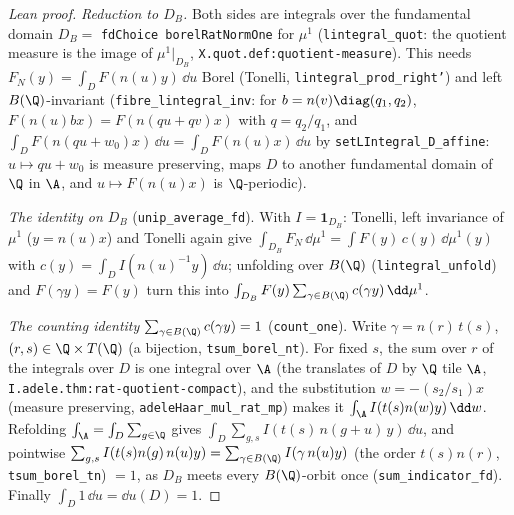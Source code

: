 \begin{proof}[Lean proof]
\emph{Reduction to $D_B$.} Both sides are integrals over the fundamental domain $D_B=$ \texttt{fdChoice borelRatNormOne} for $\mu^1$ (\texttt{lintegral\_quot}: the quotient measure is the image of $\mu^1|_{D_B}$, \texttt{X.quot.def:quotient-measure}). This needs $F_N(y)=\int_DF(n(u)y)\,\dd u$ Borel (Tonelli, \texttt{lintegral\_prod\_right'}) and left $B(\Q)$-invariant (\texttt{fibre\_lintegral\_inv}: for $b=n(v)\diag(q_1,q_2)$, $F(n(u)bx)=F(n(qu+qv)x)$ with $q=q_2/q_1$, and $\int_DF(n(qu+w_0)x)\,\dd u=\int_DF(n(u)x)\,\dd u$ by \texttt{setLIntegral\_D\_affine}: $u\mapsto qu+w_0$ is measure preserving, maps $D$ to another fundamental domain of $\Q$ in $\A$, and $u\mapsto F(n(u)x)$ is $\Q$-periodic).

\emph{The identity on $D_B$} (\texttt{unip\_average\_fd}). With $I=\mathbf 1_{D_B}$: Tonelli, left invariance of $\mu^1$ ($y=n(u)x$) and Tonelli again give $\int_{D_B}F_N\,\dd\mu^1=\int F(y)\,c(y)\,\dd\mu^1(y)$ with $c(y)=\int_DI(n(u)^{-1}y)\,\dd u$; unfolding over $B(\Q)$ (\texttt{lintegral\_unfold}) and $F(\gamma y)=F(y)$ turn this into $\int_{D_B}F(y)\sum_{\gamma\in B(\Q)}c(\gamma y)\,\dd\mu^1$.

\emph{The counting identity} $\sum_{\gamma\in B(\Q)}c(\gamma y)=1$ (\texttt{count\_one}). Write $\gamma=n(r)\,t(s)$, $(r,s)\in\Q\times T(\Q)$ (a bijection, \texttt{tsum\_borel\_nt}). For fixed $s$, the sum over $r$ of the integrals over $D$ is one integral over $\A$ (the translates of $D$ by $\Q$ tile $\A$, \texttt{I.adele.thm:rat-quotient-compact}), and the substitution $w=-(s_2/s_1)x$ (measure preserving, \texttt{adeleHaar\_mul\_rat\_mp}) makes it $\int_\A I(t(s)n(w)y)\,\dd w$. Refolding $\int_\A=\int_D\sum_{g\in\Q}$ gives $\int_D\sum_{g,s}I(t(s)\,n(g+u)\,y)\,\dd u$, and pointwise $\sum_{g,s}I(t(s)n(g)\,n(u)y)=\sum_{\gamma\in B(\Q)}I(\gamma\,n(u)y)$ (the order $t(s)n(r)$, \texttt{tsum\_borel\_tn}) $=1$, as $D_B$ meets every $B(\Q)$-orbit once (\texttt{sum\_indicator\_fd}). Finally $\int_D1\,\dd u=\dd u(D)=1$.
\end{proof}

